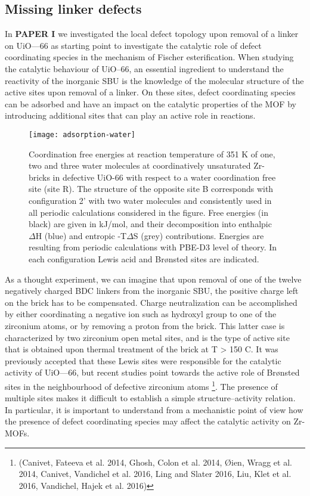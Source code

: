 \subsection{Missing linker defects}
In \textbf{PAPER I} we investigated the local defect topology upon removal of a linker on UiO—66 as starting point to investigate the catalytic role of defect coordinating species in the mechanism of Fischer esterification. When studying the catalytic behaviour of UiO--66, an essential ingredient to understand the reactivity of the inorganic SBU is the knowledge of the molecular structure of the active sites upon removal of a linker. On these sites, defect coordinating species can be adsorbed and have an impact on the catalytic properties of the MOF by introducing additional sites that can play an active role in reactions. 
\begin{figure}[!htp]
	\centering
	\texttt{[image: adsorption-water]}
	\caption{Coordination free energies at reaction temperature of 351 K of one, two and three water molecules at coordinatively unsaturated Zr-bricks in defective UiO-66 with respect to a water coordination free site (site R). The structure of the opposite site B corresponds with configuration 2’ with two water molecules and consistently used in all periodic calculations considered in the figure. Free energies (in black) are given in kJ/mol, and their decomposition into enthalpic $\Delta$H (blue) and entropic -T$\Delta$S (grey) contributions. Energies are resulting from periodic calculations with PBE-D3 level of theory. In each configuration Lewis acid and Brønsted sites are indicated.}
	\label{fig:adsorption-water}
\end{figure}
As a thought experiment, we can imagine that upon removal of one of the twelve negatively charged BDC linkers from the inorganic  SBU, the positive charge left on the brick has to be compensated. Charge neutralization can be accomplished by either coordinating a negative ion such as hydroxyl group to one of the zirconium atoms, or by removing a proton from the brick. This latter case is characterized by two zirconium open metal sites, and is the type of active site that is obtained upon thermal treatment of the brick at T > 150 C.  It was previously accepted that these Lewis sites were responsible for the catalytic activity of UiO—66, but recent studies point towards the active role of Br\o{}nsted sites in the neighbourhood of defective zirconium atoms \footnote{(Canivet, Fateeva et al. 2014, Ghosh, Colon et al. 2014, Øien, Wragg et al. 2014, Canivet, Vandichel et al. 2016, Ling and Slater 2016, Liu, Klet et al. 2016, Vandichel, Hajek et al. 2016)}. The presence of multiple sites makes it difficult to establish a simple structure--activity relation. In particular, it is important to understand from a mechanistic point of view how the presence of defect coordinating species may affect the catalytic activity on Zr-MOFs. 
